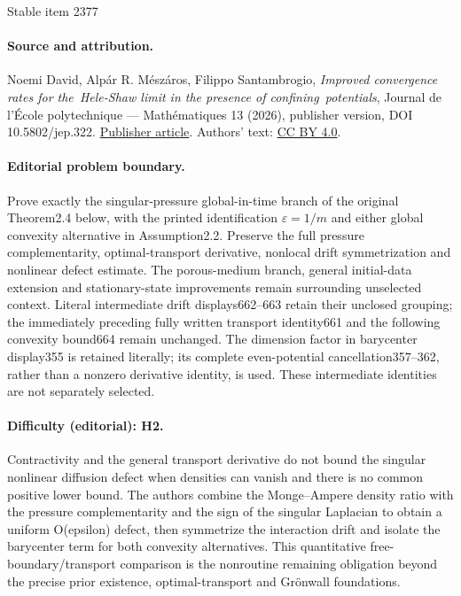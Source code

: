 \documentclass[11pt]{article}
\numberwithin{equation}{section}
\theoremstyle{plain}
\theoremstyle{remark}
\begin{document}
\begin{center}{\Large Stable item 2377}\end{center}
\paragraph{Source and attribution.}
Noemi David, Alpár R. Mészáros, Filippo Santambrogio, \emph{Improved convergence rates for the Hele-Shaw limit in the presence of confining potentials}, Journal de l’École polytechnique — Mathématiques 13 (2026), publisher version, DOI 10.5802/jep.322. \href{https://jep.centre-mersenne.org/articles/10.5802/jep.322/}{Publisher article}. Authors' text: \href{https://creativecommons.org/licenses/by/4.0/}{CC BY 4.0}.
\paragraph{Editorial problem boundary.}
Prove exactly the singular-pressure global-in-time branch of the original Theorem2.4 below, with the printed identification $\varepsilon=1/m$ and either global convexity alternative in Assumption2.2. Preserve the full pressure complementarity, optimal-transport derivative, nonlocal drift symmetrization and nonlinear defect estimate. The porous-medium branch, general initial-data extension and stationary-state improvements remain surrounding unselected context. Literal intermediate drift displays662–663 retain their unclosed grouping; the immediately preceding fully written transport identity661 and the following convexity bound664 remain unchanged. The dimension factor in barycenter display355 is retained literally; its complete even-potential cancellation357–362, rather than a nonzero derivative identity, is used. These intermediate identities are not separately selected.
\paragraph{Difficulty (editorial): H2.}
Contractivity and the general transport derivative do not bound the singular nonlinear diffusion defect when densities can vanish and there is no common positive lower bound. The authors combine the Monge–Ampere density ratio with the pressure complementarity and the sign of the singular Laplacian to obtain a uniform O(epsilon) defect, then symmetrize the interaction drift and isolate the barycenter term for both convexity alternatives. This quantitative free-boundary/transport comparison is the nonroutine remaining obligation beyond the precise prior existence, optimal-transport and Grönwall foundations.
\end{document}
